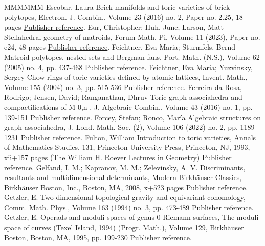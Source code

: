 \documentclass[11pt]{article}
\theoremstyle{definition}
\numberwithin{equation}{section}
\begin{document}
\begin{thebibliography}{MMMMMM}
 Escobar, Laura Brick manifolds and toric varieties of brick polytopes, Electron. J. Combin., Volume 23 (2016) no. 2, Paper no. 2.25, 18 pages \href{https://alco.centre-mersenne.org/articles/10.5802/alco.347/#MR3512647}{Publisher reference}.
 Eur, Christopher; Huh, June; Larson, Matt Stellahedral geometry of matroids, Forum Math. Pi, Volume 11 (2023), Paper no. e24, 48 pages \href{https://alco.centre-mersenne.org/articles/10.5802/alco.347/#Stellar}{Publisher reference}.
 Feichtner, Eva Maria; Sturmfels, Bernd Matroid polytopes, nested sets and Bergman fans, Port. Math. (N.S.), Volume 62 (2005) no. 4, pp. 437-468 \href{https://alco.centre-mersenne.org/articles/10.5802/alco.347/#MR2191630}{Publisher reference}.
 Feichtner, Eva Maria; Yuzvinsky, Sergey Chow rings of toric varieties defined by atomic lattices, Invent. Math., Volume 155 (2004) no. 3, pp. 515-536 \href{https://alco.centre-mersenne.org/articles/10.5802/alco.347/#MR2038195}{Publisher reference}.
 Ferreira da Rosa, Rodrigo; Jensen, David; Ranganathan, Dhruv Toric graph associahedra and compactifications of M 0,n , J. Algebraic Combin., Volume 43 (2016) no. 1, pp. 139-151 \href{https://alco.centre-mersenne.org/articles/10.5802/alco.347/#MR3439304}{Publisher reference}.
 Forcey, Stefan; Ronco, María Algebraic structures on graph associahedra, J. Lond. Math. Soc. (2), Volume 106 (2022) no. 2, pp. 1189-1231 \href{https://alco.centre-mersenne.org/articles/10.5802/alco.347/#jlms.12596}{Publisher reference}.
 Fulton, William Introduction to toric varieties, Annals of Mathematics Studies, 131, Princeton University Press, Princeton, NJ, 1993, xii+157 pages (The William H. Roever Lectures in Geometry) \href{https://alco.centre-mersenne.org/articles/10.5802/alco.347/#MR1234037}{Publisher reference}.
 Gelfand, I. M.; Kapranov, M. M.; Zelevinsky, A. V. Discriminants, resultants and multidimensional determinants, Modern Birkhäuser Classics, Birkhäuser Boston, Inc., Boston, MA, 2008, x+523 pages \href{https://alco.centre-mersenne.org/articles/10.5802/alco.347/#MR2394437}{Publisher reference}.
 Getzler, E. Two-dimensional topological gravity and equivariant cohomology, Comm. Math. Phys., Volume 163 (1994) no. 3, pp. 473-489 \href{https://alco.centre-mersenne.org/articles/10.5802/alco.347/#MR1284793}{Publisher reference}.
 Getzler, E. Operads and moduli spaces of genus 0 Riemann surfaces, The moduli space of curves (Texel Island, 1994) (Progr. Math.), Volume 129, Birkhäuser Boston, Boston, MA, 1995, pp. 199-230 \href{https://alco.centre-mersenne.org/articles/10.5802/alco.347/#MR1363058}{Publisher reference}.

\end{thebibliography}
\end{document}
